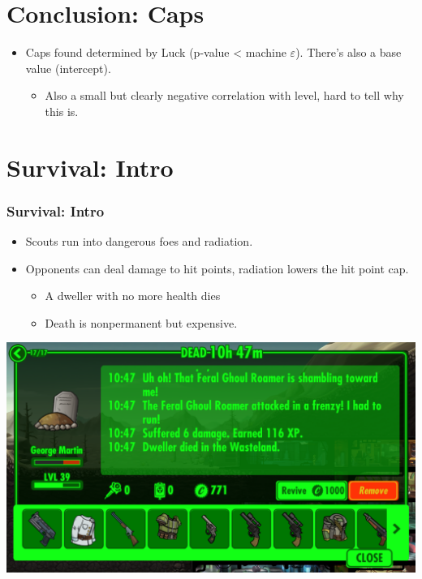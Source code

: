 \documentclass{beamer}
\begin{document}
\section{Conclusion: Caps}
\begin{frame}
\begin{itemize}
  \item Caps found determined by Luck (p-value < machine $\varepsilon$). There's also a base value (intercept).
  \begin{itemize}
  \item Also a small but clearly negative correlation with level, hard to tell why this is.
  \end{itemize}
  \end{itemize}
\end{frame}

\section{Survival: Intro}
\begin{frame}
  \frametitle{Survival: Intro}
  \begin{itemize}
  \item Scouts run into dangerous foes and radiation.
  \item Opponents can deal damage to hit points, radiation lowers the hit point cap.
  \begin{itemize}
  \item A dweller with no more health dies
  \item Death is nonpermanent but expensive.
  \end{itemize}
  \end{itemize}
\end{frame}

\begin{frame}
\centering
  \includegraphics[width = .9\textwidth]{death}
  \hfill\\
\end{frame}
\end{document}

